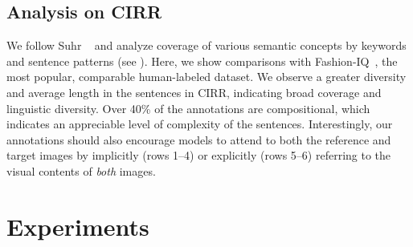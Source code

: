 \documentclass[10pt,twocolumn,letterpaper]{article}
\newcommand{\dstname}{CIRR\xspace}
\begin{document}
 \begin{table}[!ht]
  \centering {}
    \caption{Statistics of CIRR. Each reference-target image pair is associated with one annotation.}
    \label{tab:dst_stats}
\end{table}

 \subsection{Analysis on \dstname}
  
We follow Suhr \etal~\cite{Suhr_2019_nlvr2} and analyze coverage of various semantic concepts by keywords and sentence patterns (see ). Here, we show comparisons with Fashion-IQ~\cite{fashioniq}, the most popular, comparable human-labeled dataset.
We observe a greater diversity and average length in the sentences in CIRR, indicating broad coverage and linguistic diversity.
Over 40\% of the annotations are compositional, which indicates an appreciable level of complexity of the sentences.
Interestingly, our annotations should also encourage models to attend to both the reference and target images by implicitly (rows 1--4) or explicitly (rows 5--6) referring to the visual contents of \emph{both} images.

\section{Experiments}
\end{document}
